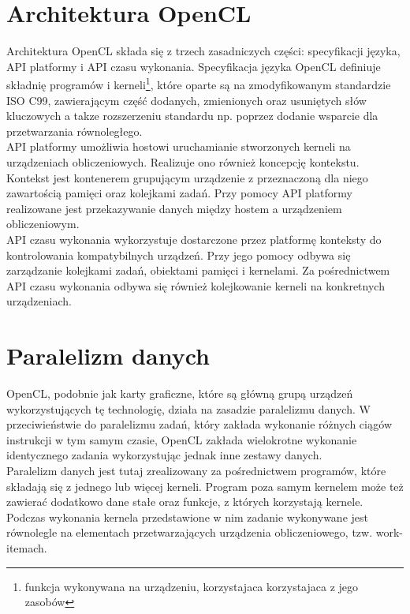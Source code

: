 \section{Architektura OpenCL}
Architektura OpenCL składa się z trzech zasadniczych części: specyfikacji języka, API platformy i API czasu wykonania. Specyfikacja języka OpenCL definiuje składnię programów i kerneli\footnote{funkcja wykonywana na urządzeniu, korzystajaca korzystajaca z jego zasobów}, które oparte są na zmodyfikowanym standardzie ISO C99, zawierającym część dodanych, zmienionych oraz usuniętych słów kluczowych a takze rozszerzeniu standardu np. poprzez dodanie wsparcie dla przetwarzania równoległego. \\
API platformy umożliwia hostowi uruchamianie stworzonych kerneli na urządzeniach obliczeniowych. Realizuje ono również koncepcję kontekstu. Kontekst jest kontenerem grupującym urządzenie z przeznaczoną dla niego zawartością pamięci oraz kolejkami zadań. Przy pomocy API platformy realizowane jest przekazywanie danych między hostem a urządzeniem obliczeniowym. \\
API czasu wykonania wykorzystuje dostarczone przez platformę konteksty do kontrolowania kompatybilnych urządzeń. Przy jego pomocy odbywa się zarządzanie kolejkami zadań, obiektami pamięci i kernelami. Za pośrednictwem API czasu wykonania odbywa się również kolejkowanie kerneli na konkretnych urządzeniach.

\section{Paralelizm danych}
OpenCL, podobnie jak karty graficzne, które są główną grupą urządzeń wykorzystujących tę technologię, działa na zasadzie paralelizmu danych. W przeciwieństwie do paralelizmu zadań, który zakłada wykonanie różnych ciągów instrukcji w tym samym czasie, OpenCL zakłada wielokrotne wykonanie identycznego zadania wykorzystując jednak inne zestawy danych. \\
Paralelizm danych jest tutaj zrealizowany za pośrednictwem programów, które składają się z jednego lub więcej kerneli. Program poza samym kernelem może też zawierać dodatkowo dane stałe oraz funkcje, z których korzystają kernele. Podczas wykonania kernela przedstawione w nim zadanie wykonywane jest równolegle na elementach przetwarzających urządzenia obliczeniowego, tzw. work-itemach. \\
\newpage
